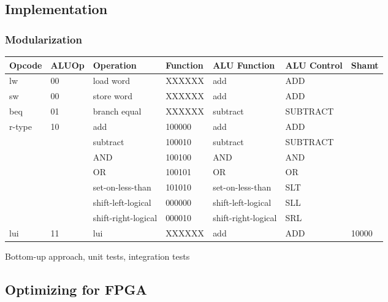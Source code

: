 \subsection{Implementation}

\subsubsection{Modularization}

\begin{table}
    \begin{tabular}{|l|l|l|l|l|l|l|}
    \hline
    Opcode & ALUOp & Operation           & Function & ALU Function        & ALU Control & Shamt   \\ \hline
    lw     & 00    & load word           & XXXXXX   & add                 & ADD         & \\ \hline
    sw     & 00    & store word          & XXXXXX   & add                 & ADD         & \\ \hline
    beq    & 01    & branch equal        & XXXXXX   & subtract            & SUBTRACT    & \\ \hline
    r-type & 10    & add                 & 100000   & add                 & ADD         & \\ \cline{3-7}
           &       & subtract            & 100010   & subtract            & SUBTRACT    & \\ \cline{3-7}
           &       & AND                 & 100100   & AND                 & AND         & \\ \cline{3-7}
           &       & OR                  & 100101   & OR                  & OR          & \\ \cline{3-7}
           &       & set-on-less-than    & 101010   & set-on-less-than    & SLT         & \\ \cline{3-7}
           &       & shift-left-logical  & 000000   & shift-left-logical  & SLL         & \\ \cline{3-7}
           &       & shift-right-logical & 000010   & shift-right-logical & SRL         & \\ \hline
    lui    & 11    & lui                 & XXXXXX   & add                 & ADD         & 10000 \\ \hline
    \end{tabular}
\end{table}

Bottom-up approach, unit tests, integration tests

\subsection{Optimizing for FPGA}


